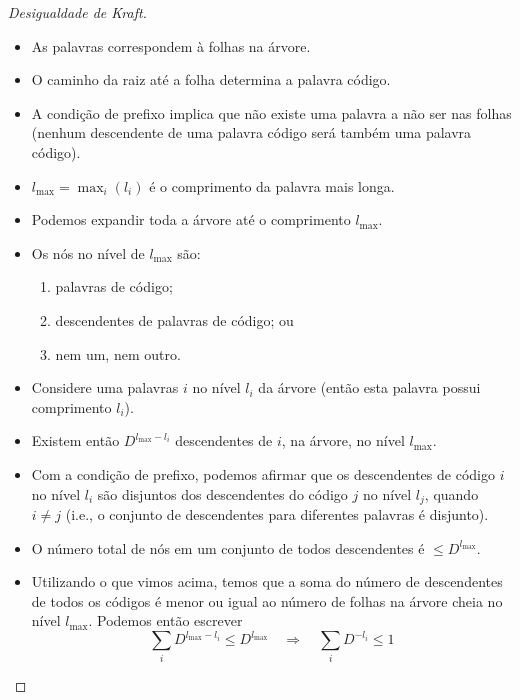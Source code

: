 \begin{frame}[allowframebreaks]
\begin{proof}[Desigualdade de Kraft]
  \proofbreak

  \begin{itemize}
  \item As palavras correspondem à folhas na árvore.
  \item O caminho da raiz até a folha determina a palavra código.
  \item A condição de prefixo implica que não existe uma palavra a não ser nas folhas 
	(nenhum descendente de uma palavra código será também uma palavra código).
  \item $l_{\text{max}} = \max_i (l_i)$ é o comprimento da palavra mais longa.
  \item Podemos expandir toda a árvore até o comprimento $l_{\text{max}}$.
  \item Os nós no nível de $l_{\text{max}}$ são:
	\begin{enumerate}
	\item palavras de código;
	\item descendentes de palavras de código; ou
	\item nem um, nem outro.
	\end{enumerate}
  \end{itemize}
  \proofbreak
  \begin{itemize}
  \item Considere uma palavras $i$ no nível $l_i$ da árvore (então esta palavra possui comprimento $l_i$).
  \item Existem então $D^{l_{\text{max}} - l_i}$ descendentes de $i$, na árvore, no nível $l_{\text{max}}$.
  \item Com a condição de prefixo, podemos afirmar que os descendentes de código $i$ no nível $l_i$ são
	disjuntos dos descendentes do código $j$ no nível $l_j$, quando $i \neq j$ (i.e., o conjunto de
	descendentes para diferentes palavras é disjunto).
  \item O número total de nós em um conjunto de todos descendentes é $\leq D^{l_{\text{max}}}$.
  \end{itemize}
  \proofbreak
  \begin{itemize}
  \item Utilizando o que vimos acima, temos que a soma do número de descendentes de todos os códigos é menor ou
	igual ao número de folhas na árvore cheia no nível $l_{\text{max}}$. Podemos então escrever
	\begin{equation}
	\sum_i D^{l_{\text{max}} - l_i} \leq D^{l_{\text{max}}} \quad \Rightarrow \quad \sum_i D^{-l_i} \leq 1
	\end{equation}

\end{itemize}
\end{proof}
\end{frame}
